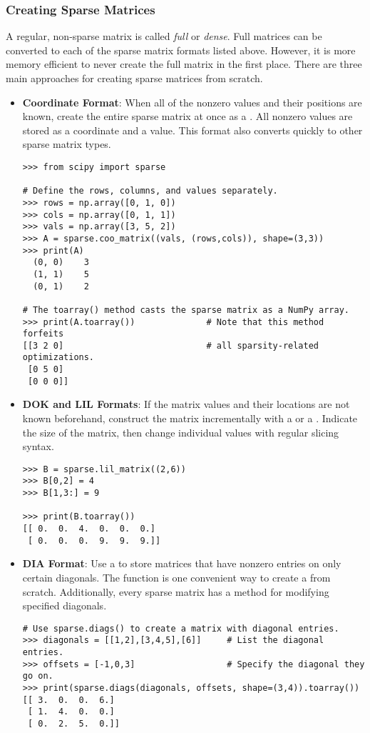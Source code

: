 \subsubsection*{Creating Sparse Matrices} %

A regular, non-sparse matrix is called \emph{full} or \emph{dense}.
Full matrices can be converted to each of the sparse matrix formats listed above.
However, it is more memory efficient to never create the full matrix in the first place.
There are three main approaches for creating sparse matrices from scratch.

\begin{itemize} %

\item \textbf{Coordinate Format}:
When all of the nonzero values and their positions are known, create the entire sparse matrix at once as a .
All nonzero values are stored as a coordinate and a value.
This format also converts quickly to other sparse matrix types.

\begin{lstlisting}
>>> from scipy import sparse

# Define the rows, columns, and values separately.
>>> rows = np.array([0, 1, 0])
>>> cols = np.array([0, 1, 1])
>>> vals = np.array([3, 5, 2])
>>> A = sparse.coo_matrix((vals, (rows,cols)), shape=(3,3))
>>> print(A)
  (0, 0)    3
  (1, 1)    5
  (0, 1)    2

# The toarray() method casts the sparse matrix as a NumPy array.
>>> print(A.toarray())              # Note that this method forfeits
[[3 2 0]                            # all sparsity-related optimizations.
 [0 5 0]
 [0 0 0]]
\end{lstlisting}

\item \textbf{DOK and LIL Formats}:
If the matrix values and their locations are not known beforehand, construct the matrix incrementally with a  or a .
Indicate the size of the matrix, then change individual values with regular slicing syntax.

\begin{lstlisting}
>>> B = sparse.lil_matrix((2,6))
>>> B[0,2] = 4
>>> B[1,3:] = 9

>>> print(B.toarray())
[[ 0.  0.  4.  0.  0.  0.]
 [ 0.  0.  0.  9.  9.  9.]]
\end{lstlisting}

\item \textbf{DIA Format}: Use a  to store matrices that have nonzero entries on only certain diagonals.
The function  is one convenient way to create a  from scratch.
Additionally, every sparse matrix has a  method for modifying specified diagonals.
\begin{lstlisting}
# Use sparse.diags() to create a matrix with diagonal entries.
>>> diagonals = [[1,2],[3,4,5],[6]]     # List the diagonal entries.
>>> offsets = [-1,0,3]                  # Specify the diagonal they go on.
>>> print(sparse.diags(diagonals, offsets, shape=(3,4)).toarray())
[[ 3.  0.  0.  6.]
 [ 1.  4.  0.  0.]
 [ 0.  2.  5.  0.]]


\end{lstlisting}
\end{itemize}
